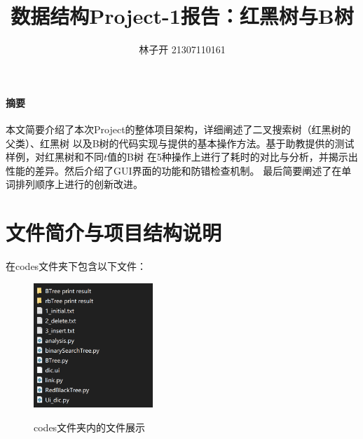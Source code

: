 \documentclass{article}
\title{数据结构Project-1报告：红黑树与B树 }
\author{林子开 21307110161}
\begin{document}
	\maketitle

\paragraph{摘要}
本文简要介绍了本次Project的整体项目架构，详细阐述了二叉搜索树（红黑树的父类）、红黑树
以及B树的代码实现与提供的基本操作方法。基于助教提供的测试样例，对红黑树和不同$t$值的B树
在5种操作上进行了耗时的对比与分析，并揭示出性能的差异。然后介绍了GUI界面的功能和防错检查机制。
最后简要阐述了在单词排列顺序上进行的创新改进。

	\tableofcontents

\section{文件简介与项目结构说明}
在codes文件夹下包含以下文件：
\begin{figure}[H]
	\centering
	{\includegraphics[width=0.4\textwidth]{image//文件说明.png}} 
	\caption{codes文件夹内的文件展示}
\end{figure}
\end{document}

